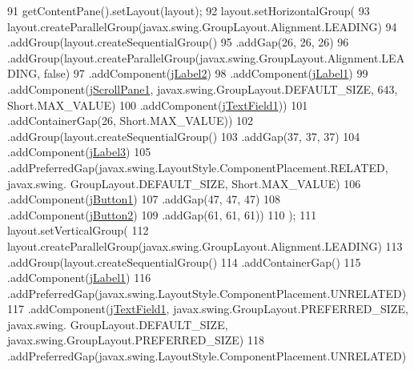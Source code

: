 \begin{DoxyCode}
91         getContentPane().setLayout(layout);
92         layout.setHorizontalGroup(
93             layout.createParallelGroup(javax.swing.GroupLayout.Alignment.LEADING)
94             .addGroup(layout.createSequentialGroup()
95                 .addGap(26, 26, 26)
96                 .addGroup(layout.createParallelGroup(javax.swing.GroupLayout.Alignment.LEADING, \textcolor{keyword}{false})
97                     .addComponent(\mbox{\hyperlink{classpecl3ignacioriberalocks_1_1_libreria_a8572be6fed6415a38a67dec66ee65efc}{jLabel2}})
98                     .addComponent(\mbox{\hyperlink{classpecl3ignacioriberalocks_1_1_libreria_a6c9ed6af66a5a6313bb5d24403bd55a4}{jLabel1}})
99                     .addComponent(\mbox{\hyperlink{classpecl3ignacioriberalocks_1_1_libreria_a1542942d7ab23017f40dfa5d553322c9}{jScrollPane1}}, javax.swing.GroupLayout.DEFAULT\_SIZE, 643, 
      Short.MAX\_VALUE)
100                     .addComponent(\mbox{\hyperlink{classpecl3ignacioriberalocks_1_1_libreria_ab0c60354cb4ed1ed51a374857bd3e706}{jTextField1}}))
101                 .addContainerGap(26, Short.MAX\_VALUE))
102             .addGroup(layout.createSequentialGroup()
103                 .addGap(37, 37, 37)
104                 .addComponent(\mbox{\hyperlink{classpecl3ignacioriberalocks_1_1_libreria_a5f3330e2cc3fb9dc95566b31f55d24da}{jLabel3}})
105                 .addPreferredGap(javax.swing.LayoutStyle.ComponentPlacement.RELATED, javax.swing.
      GroupLayout.DEFAULT\_SIZE, Short.MAX\_VALUE)
106                 .addComponent(\mbox{\hyperlink{classpecl3ignacioriberalocks_1_1_libreria_aa1f6bf3a865167c265ce9c0c8baf8eca}{jButton1}})
107                 .addGap(47, 47, 47)
108                 .addComponent(\mbox{\hyperlink{classpecl3ignacioriberalocks_1_1_libreria_acc9d4371c4ed2d11e66f0c90303d10a5}{jButton2}})
109                 .addGap(61, 61, 61))
110         );
111         layout.setVerticalGroup(
112             layout.createParallelGroup(javax.swing.GroupLayout.Alignment.LEADING)
113             .addGroup(layout.createSequentialGroup()
114                 .addContainerGap()
115                 .addComponent(\mbox{\hyperlink{classpecl3ignacioriberalocks_1_1_libreria_a6c9ed6af66a5a6313bb5d24403bd55a4}{jLabel1}})
116                 .addPreferredGap(javax.swing.LayoutStyle.ComponentPlacement.UNRELATED)
117                 .addComponent(\mbox{\hyperlink{classpecl3ignacioriberalocks_1_1_libreria_ab0c60354cb4ed1ed51a374857bd3e706}{jTextField1}}, javax.swing.GroupLayout.PREFERRED\_SIZE, javax.swing.
      GroupLayout.DEFAULT\_SIZE, javax.swing.GroupLayout.PREFERRED\_SIZE)
118                 .addPreferredGap(javax.swing.LayoutStyle.ComponentPlacement.UNRELATED)

\end{DoxyCode}
